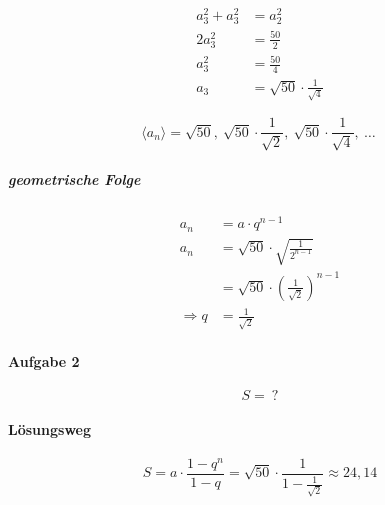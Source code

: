 \begin{align*}
	a_3^2 + a_3^2 & = a_2^2                              \\
	2 a_3^2       & = \frac{50}{2}                       \\
	a_3^2         & = \frac{50}{4}                       \\
	a_3           & = \sqrt{50} \cdot \frac{1}{\sqrt{4}}
\end{align*}

\[
	\langle a_n \rangle = \sqrt{50},\ \sqrt{50} \cdot \frac{1}{\sqrt{2}},\ \sqrt{50} \cdot \frac{1}{\sqrt{4}},\ \ldots \
\]

\subparagraph{geometrische Folge}

\begin{align*}
	a_n           & = a \cdot q^{n-1}                                         \\
	a_n           & = \sqrt{50} \cdot \sqrt{\frac{1}{2^{n-1}}}                \\
	              & = \sqrt{50} \cdot {\left(\frac{1}{\sqrt{2}}\right)}^{n-1} \\
	\Rightarrow q & = \frac{1}{\sqrt{2}}
\end{align*}

\paragraph{Aufgabe 2}

\[
	S =\ ?
\]

\paragraph{Lösungsweg}

\[
	S = a \cdot \frac{1 - q^n}{1 - q} = \sqrt{50} \cdot \frac{1}{1- \frac{1}{\sqrt{2}}} \approx 24,14
\]
